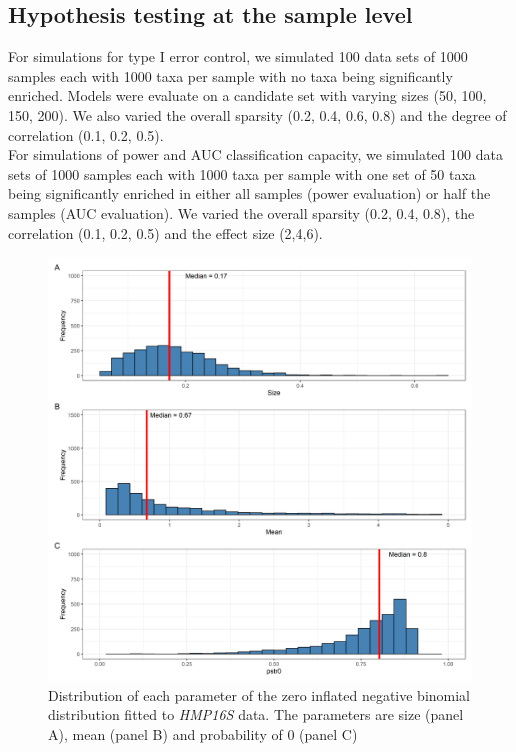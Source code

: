 \documentclass{article}
\begin{document}
\subsection{Hypothesis testing at the sample level}
\noindent For simulations for type I error control, we simulated 100 data sets of 1000 samples each with 1000 taxa per sample with no taxa being significantly enriched. Models were evaluate on a candidate set with varying sizes (50, 100, 150, 200). We also varied the overall sparsity (0.2, 0.4, 0.6, 0.8) and the degree of correlation (0.1, 0.2, 0.5). \\

\noindent For simulations of power and AUC classification capacity, we simulated 100 data sets of 1000 samples each with 1000 taxa per sample with one set of 50 taxa being significantly enriched in either all samples (power evaluation) or half the samples (AUC evaluation). We varied the overall sparsity (0.2, 0.4, 0.8), the correlation (0.1, 0.2, 0.5) and the effect size (2,4,6). \\



\begin{figure}[h]
    \centering
    \includegraphics[width=0.6\linewidth]{figures/HMP_fit.png}
    \caption{Distribution of each parameter of the zero inflated negative binomial distribution fitted to \emph{HMP16S} data. The parameters are size (panel A), mean (panel B) and probability of 0 (panel C)}
\end{figure}


\newpage
{}

\end{document}
